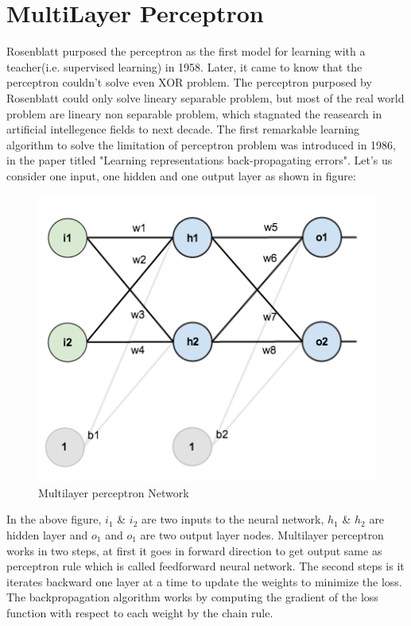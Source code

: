 \documentclass[a4paper,12pt]{report}
\begin{document}
\section{MultiLayer Perceptron}
Rosenblatt purposed the perceptron as the first model for learning with a teacher(i.e. supervised learning) in 1958. Later, it came to know that the perceptron couldn't solve even XOR problem. The perceptron purposed by Rosenblatt could only solve lineary separable problem, but most of the real world problem are lineary non separable problem, which stagnated the reasearch in artificial intellegence fields to next decade. The first remarkable learning algorithm to solve the limitation of perceptron problem was introduced in 1986, in the paper titled "Learning representations back-propagating errors". Let's us consider one input, one hidden and one output layer as shown in figure:
\begin{figure}[htp]
\centering
\includegraphics[scale=0.5]{resources/image-06.png}
\caption{Multilayer perceptron Network}
\label{}
\end{figure} 

In the above figure, $i_1$ \& $i_2$ are two inputs to the neural network, $h_1$ \& $h_2$ are hidden layer and $o_1$ and $o_1$ are two output layer nodes.
Multilayer perceptron works in two steps, at first it goes in forward direction to get output same as perceptron rule which is called feedforward neural network. The second steps is it iterates backward one layer at a time to update the weights to minimize the loss. The backpropagation algorithm works by computing the gradient of the loss function with respect to each weight by the chain rule.
\end{document}
